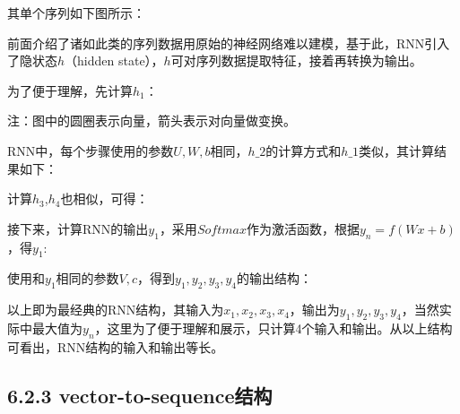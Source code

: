 其单个序列如下图所示：


前面介绍了诸如此类的序列数据用原始的神经网络难以建模，基于此，RNN引入了隐状态\(h\)（hidden
state），\(h​\)可对序列数据提取特征，接着再转换为输出。

为了便于理解，先计算\(h_1​\)：


注：图中的圆圈表示向量，箭头表示对向量做变换。

RNN中，每个步骤使用的参数\texttt{$U,W,b$}​相同，\texttt{$h\_2$}的计算方式和\texttt{$h\_1​$}类似，其计算结果如下：


计算\(h_3\),\(h_4​\)也相似，可得：


接下来，计算RNN的输出\(y_1\)，采用\(Softmax\)作为激活函数，根据\(y_n=f(Wx+b)\)，得\(y_1​\):


使用和\(y_1​\)相同的参数\(V,c​\)，得到\(y_1,y_2,y_3,y_4​\)的输出结构：


以上即为最经典的RNN结构，其输入为\(x_1,x_2,x_3,x_4\)，输出为\(y_1,y_2,y_3,y_4\)，当然实际中最大值为\(y_n\)，这里为了便于理解和展示，只计算4个输入和输出。从以上结构可看出，RNN结构的输入和输出等长。

\subsection{6.2.3
vector-to-sequence结构}\label{vector-to-sequenceux7ed3ux6784}

